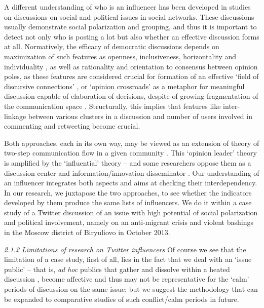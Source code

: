 A different understanding of who is an influencer has been developed in studies on discussions on social and political issues in social networks. These discussions usually demonstrate social polarization and grouping, and thus it is important to detect not only who is posting a lot but also whether an effective discussion forms at all. Normatively, the efficacy of democratic discussions depends on maximization of such features as openness, inclusiveness, horizontality and individuality \cite{Fuchs,Papacharissi2010}, as well as rationality and orientation to consensus between opinion poles, as these features are considered crucial for formation of an effective ‘field of discursive connections’ \cite[p.~37]{Calhoun}, or ‘opinion crossroads’ as a metaphor for meaningful discussion capable of elaboration of decisions, despite of growing fragmentation of the communication space \cite{BrunsHighfeld2016}. Structurally, this implies that features like inter-linkage between various clusters in a discussion and number of users involved in commenting and retweeting become crucial.

Both approaches, each in its own way, may be viewed as an extension of theory of two-step communication flow in a given community \cite{KatzLazarsfeld1957}. This ‘opinion leader’ theory is amplified by the ‘influential’ theory \cite{Rogers} -- and some researchers oppose them as a discussion center and information/innovation disseminator \cite[p.~1261]{DuboisGaffney}. Our understanding of an influencer integrates both aspects and aims at checking their interdependency. In our research, we juxtapose the two approaches, to see whether the indicators developed by them produce the same lists of influencers. We do it within a case study of a Twitter discussion of an issue with high potential of social polarization and political involvement, namely on an anti-migrant crisis and violent bashings in the Moscow district of Biryuliovo in October 2013.

\textit{2.1.2 Limitations of research on Twitter influencers}
Of course we see that the limitation of a case study, first of all, lies in the fact that we deal with an ‘issue public’ \cite[p.~422]{Habermas} \cite[p.~108]{BrunsHighfeld2016} -- that is, \textit{ad hoc} publics \cite{BrunsBurgess} that gather and dissolve within a heated discussion \cite[p.~74]{Dahlgren}, become affective \cite{Papacharissi} and thus may not be representative for the ‘calm’ periods of discussion on the same issue; but we suggest the methodology that can be expanded to comparative studies of such conflict/calm periods in future.


